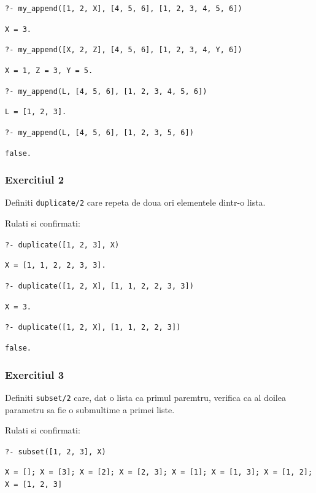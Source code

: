 \texttt{?- my\_append([1, 2, X], [4, 5, 6], [1, 2, 3, 4, 5, 6])}

\texttt{X = 3.}

\texttt{?- my\_append([X, 2, Z], [4, 5, 6], [1, 2, 3, 4, Y, 6])}

\texttt{X = 1, Z = 3, Y = 5.}

\texttt{?- my\_append(L, [4, 5, 6], [1, 2, 3, 4, 5, 6])}

\texttt{L = [1, 2, 3].}

\texttt{?- my\_append(L, [4, 5, 6], [1, 2, 3, 5, 6])}

\texttt{false.}




\subsubsection*{Exercitiul 2}

Definiti \texttt{duplicate/2} care repeta de doua ori elementele dintr-o lista.

Rulati si confirmati:

\texttt{?- duplicate([1, 2, 3], X)}

\texttt{X = [1, 1, 2, 2, 3, 3].}

\texttt{?- duplicate([1, 2, X], [1, 1, 2, 2, 3, 3])}

\texttt{X = 3.}

\texttt{?- duplicate([1, 2, X], [1, 1, 2, 2, 3])}

\texttt{false.}


\subsubsection*{Exercitiul 3}

Definiti \texttt{subset/2} care, dat o lista ca primul paremtru, verifica ca al doilea parametru sa fie o submultime a primei liste.

Rulati si confirmati:

\texttt{?- subset([1, 2, 3], X)}

\texttt{X = []; X = [3]; X = [2]; X = [2, 3]; X = [1]; X = [1, 3]; X = [1, 2]; X = [1, 2, 3]}
